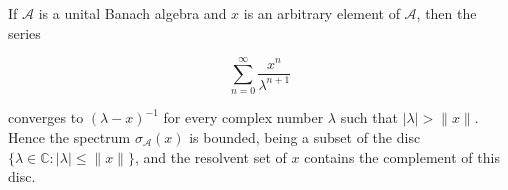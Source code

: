If $\mathcal{A}$ is a unital Banach algebra and $x$ is an arbitrary element of $\mathcal{A}$, then the series

$$\sum_{n=0}^{\infty} \frac{x^n}{\lambda^{n+1}}$$

converges to $(\lambda - x)^{-1}$ for every complex number $\lambda$ such that $|\lambda| > \|x\|$. Hence the spectrum $\sigma_{\mathcal{A}}(x)$ is bounded, being a subset of the disc $\{\lambda \in \mathbb{C}: |\lambda| \leq \|x\|\}$, and the resolvent set of $x$ contains the complement of this disc.
